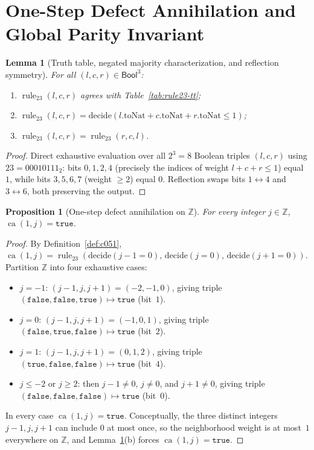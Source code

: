 \documentclass[11pt]{article}
\newtheorem{proposition}[theorem]{Proposition}
\newtheorem{lemma}[theorem]{Lemma}
\theoremstyle{definition}
\newcommand{\Z}{\mathbb{Z}}
\newcommand{\ruleTT}{\operatorname{rule}_{23}}
\newcommand{\ca}{\operatorname{ca}}
\begin{document}
\section{One-Step Defect Annihilation and Global Parity Invariant}

\begin{lemma}[Truth table, negated majority characterization, and reflection symmetry]
\label{lem:rule23}
For all $(l, c, r) \in \mathsf{Bool}^3$:
\begin{enumerate}
\item[\textup{(a)}] $\ruleTT(l, c, r)$ agrees with Table~\ref{tab:rule23-tt};
\item[\textup{(b)}] $\ruleTT(l, c, r) = \mathrm{decide}(l.\mathrm{toNat} + c.\mathrm{toNat} + r.\mathrm{toNat} \le 1)$;
\item[\textup{(c)}] $\ruleTT(l, c, r) = \ruleTT(r, c, l)$.
\end{enumerate}
\end{lemma}

\begin{proof}
Direct exhaustive evaluation over all $2^3 = 8$ Boolean triples $(l, c, r)$ using $23 = 00010111_2$: bits $0, 1, 2, 4$ (precisely the indices of weight $l + c + r \le 1$) equal $1$, while bits $3, 5, 6, 7$ (weight $\ge 2$) equal $0$. Reflection swaps bits $1 \leftrightarrow 4$ and $3 \leftrightarrow 6$, both preserving the output.
\end{proof}

\begin{proposition}[One-step defect annihilation on $\Z$]
\label{prop:ca-one}
For every integer $j \in \Z$, $\ca(1, j) = \mathtt{true}$.
\end{proposition}

\begin{proof}
By Definition~\ref{def:c051}, $\ca(1, j) = \ruleTT(\mathrm{decide}(j - 1 = 0),\, \mathrm{decide}(j = 0),\, \mathrm{decide}(j + 1 = 0))$. Partition $\Z$ into four exhaustive cases:
\begin{itemize}
\item $j = -1$: $(j - 1, j, j + 1) = (-2, -1, 0)$, giving triple $(\mathtt{false}, \mathtt{false}, \mathtt{true}) \mapsto \mathtt{true}$ (bit~$1$).
\item $j = 0$: $(j - 1, j, j + 1) = (-1, 0, 1)$, giving triple $(\mathtt{false}, \mathtt{true}, \mathtt{false}) \mapsto \mathtt{true}$ (bit~$2$).
\item $j = 1$: $(j - 1, j, j + 1) = (0, 1, 2)$, giving triple $(\mathtt{true}, \mathtt{false}, \mathtt{false}) \mapsto \mathtt{true}$ (bit~$4$).
\item $j \le -2$ or $j \ge 2$: then $j - 1 \ne 0$, $j \ne 0$, and $j + 1 \ne 0$, giving triple $(\mathtt{false}, \mathtt{false}, \mathtt{false}) \mapsto \mathtt{true}$ (bit~$0$).
\end{itemize}
In every case $\ca(1, j) = \mathtt{true}$. Conceptually, the three distinct integers $j - 1, j, j + 1$ can include $0$ at most once, so the neighborhood weight is at most~$1$ everywhere on $\Z$, and Lemma~\ref{lem:rule23}(b) forces $\ca(1, j) = \mathtt{true}$.
\end{proof}
\end{document}
